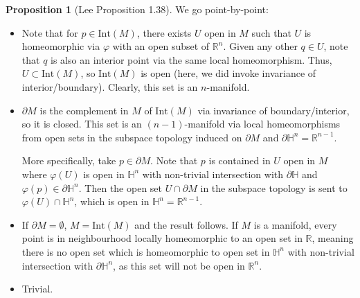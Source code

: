 \documentclass[aps,pra,showpacs,notitlepage,onecolumn,superscriptaddress,nofootinbib]{revtex4-1}
\theoremstyle{definition}
\newtheorem{proposition}{Proposition}[section]
\begin{document}
  \begin{proposition}[Lee Proposition 1.38]
    We go point-by-point:
    
    \begin{itemize}
    \item Note that for $p \in \text{Int}(M)$, there exists $U$ open in $M$ such that $U$ is homeomorphic via $\varphi$ with an open subset of $\mathbb{R}^{n}$. Given any other $q \in U$, note that
      $q$ is also an interior point via the same local homeomorphism. Thus, $U \subset \text{Int}(M)$, so $\text{Int}(M)$ is open (here, we did invoke invariance of interior/boundary). Clearly,
      this set is an $n$-manifold.
    \item $\partial M$ is the complement in $M$ of $\text{Int}(M)$ via invariance of boundary/interior, so it is closed. This set is an $(n - 1)$-manifold via local homeomorphisms from open sets in the subspace
      topology induced on $\partial M$ and $\partial \mathbb{H}^{n} = \mathbb{R}^{n - 1}$.

      More specifically, take $p \in \partial M$. Note that $p$ is contained in $U$ open in $M$ where $\varphi(U)$ is open in $\mathbb{H}^{n}$ with non-trivial intersection with $\partial \mathbb{H}$ and $\varphi(p) \in \partial \mathbb{H}^{n}$.
      Then the open set $U \cap \partial M$ in the subspace topology is sent to $\varphi(U) \cap \mathbb{H}^{n}$, which is open in $\mathbb{H}^{n} = \mathbb{R}^{n - 1}$.
    \item If $\partial M = \emptyset$, $M = \text{Int}(M)$ and the result follows. If $M$ is a manifold, every point is in neighbourhood locally homeomorphic to an open set in $\mathbb{R}$, meaning there is no
      open set which is homeomorphic to open set in $\mathbb{H}^{n}$ with non-trivial intersection with $\partial \mathbb{H}^{n}$, as this set will not be open in $\mathbb{R}^{n}$.
      \item Trivial.
    \end{itemize}
  \end{proposition}
\end{document}
